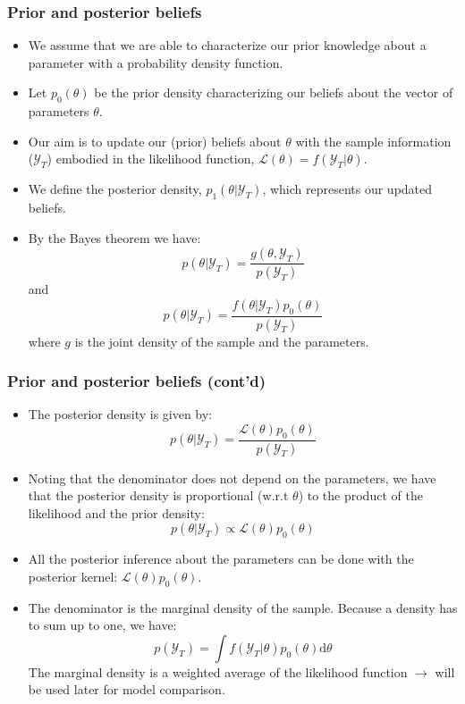 \documentclass[10pt,slidestop]{beamer}
\newcommand{\AllSample}{ \mathcal Y_T }
\begin{document}
\begin{frame}
  \frametitle{Prior and posterior beliefs}

  \begin{itemize}

  \item We assume that we are able to characterize our prior knowledge
    about a parameter with a probability density function.

  \item Let $p_0(\theta)$ be the prior density characterizing our beliefs about the vector
    of parameters $\theta$.

  \item Our aim is to update our (prior) beliefs about $\theta$ with
    the sample information ($\AllSample$) embodied in the likelihood
    function, $\mathcal L(\theta) = f(\AllSample|\theta)$.

  \item We define the posterior density, $p_1(\theta|\AllSample)$,
    which represents our updated beliefs.

   \item By the Bayes theorem we have:
     \[
     p(\theta|\AllSample) = \frac{g(\theta,\AllSample)}{p(\AllSample)}
     \]
     and
     \[
      p(\theta|\AllSample) = \frac{f(\theta|\AllSample)p_0(\theta)}{p(\AllSample)}
     \]
     where $g$ is the joint density of the sample and the parameters.
  \end{itemize}

   \end{frame}


\begin{frame}
  \frametitle{Prior and posterior beliefs (cont'd)}

  \begin{itemize}

  \item The posterior density is given by:
    \[
    p(\theta|\AllSample) = \frac{\mathcal L(\theta)p_0(\theta)}{p(\AllSample)}
    \]

  \item Noting that the denominator does not depend on the parameters,
    we have that the posterior density is proportional (w.r.t
    $\theta$) to the product of the likelihood and the prior density:
    \[
    p(\theta|\AllSample) \propto \mathcal L(\theta)p_0(\theta)
    \]

  \item All the posterior inference about the
    parameters can be done with the posterior kernel: $\mathcal
    L(\theta)p_0(\theta)$.

  \item The denominator is the marginal density of the sample. Because
    a density has to sum up to one, we have:
    \[
    p(\AllSample) = \int f(\AllSample|\theta)p_0(\theta)\mathrm d\theta
    \]
    The marginal density is a weighted average of the likelihood
    function $\rightarrow$ will be used later for model comparison.
  \end{itemize}

\end{frame}
\end{document}
